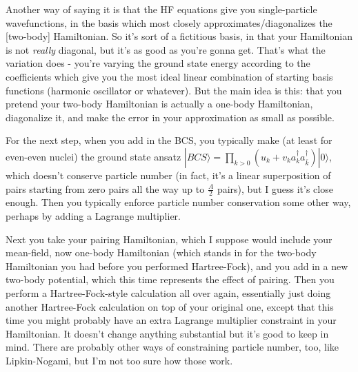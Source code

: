 Another way of saying it is that the HF equations give you single-particle wavefunctions, in the basis which most closely approximates/diagonalizes the [two-body] Hamiltonian. So it's sort of a fictitious basis, in that your Hamiltonian is not \textit{really} diagonal, but it's as good as you're gonna get. That's what the variation does - you're varying the ground state energy according to the coefficients which give you the most ideal linear combination of starting basis functions (harmonic oscillator or whatever). But the main idea is this: that you pretend your two-body Hamiltonian is actually a one-body Hamiltonian, diagonalize it, and make the error in your approximation as small as possible.

For the next step, when you add in the BCS, you typically make (at least for even-even nuclei) the ground state ansatz $|BCS\rangle = \prod_{k>0}(u_k+v_k a_k^\dagger a_{\bar{k}}^\dagger)|0\rangle$, which doesn't conserve particle number (in fact, it's a linear superposition of pairs starting from zero pairs all the way up to $\frac{A}{2}$ pairs), but I guess it's close enough. Then you typically enforce particle number conservation some other way, perhaps by adding a Lagrange multiplier.

Next you take your pairing Hamiltonian, which I suppose would include your mean-field, now one-body Hamiltonian (which stands in for the two-body Hamiltonian you had before you performed Hartree-Fock), and you add in a new two-body potential, which this time represents the effect of pairing. Then you perform a Hartree-Fock-style calculation all over again, essentially just doing another Hartree-Fock calculation on top of your original one, except that this time you might probably have an extra Lagrange multiplier constraint in your Hamiltonian. It doesn't change anything substantial but it's good to keep in mind. There are probably other ways of constraining particle number, too, like Lipkin-Nogami, but I'm not too sure how those work.

